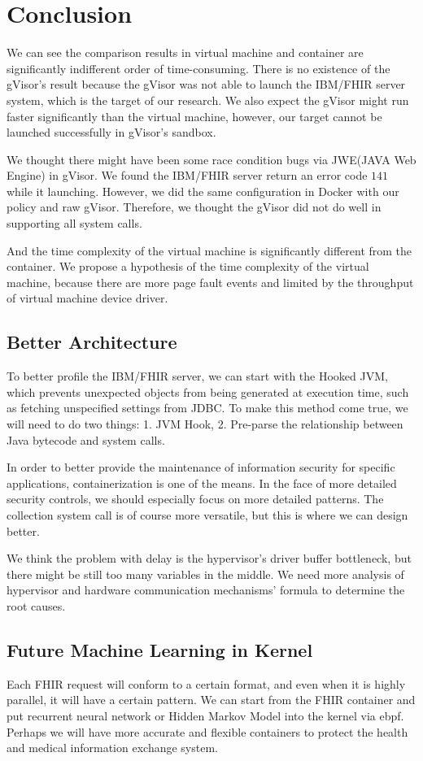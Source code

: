 \section{Conclusion}

We can see the comparison results in virtual machine and container are
significantly indifferent order of time-consuming. There is no existence
of the gVisor's result because the gVisor was not able to launch the
IBM/FHIR server system, which is the target of our research.
We also expect the gVisor might run faster significantly than the virtual
machine, however, our target cannot be launched successfully in
gVisor's sandbox.

We thought there might have been some race condition bugs via JWE(JAVA Web
Engine) in gVisor. We found the IBM/FHIR server return an error code $141$
while it launching. However, we did the same configuration in Docker with
our policy and raw gVisor. Therefore, we thought the gVisor did not do
well in supporting all system calls.

And the time complexity of the virtual machine is significantly different from
the container. We propose a hypothesis of the time complexity of the virtual
machine, because there are more page fault events and limited by the
throughput of virtual machine device driver\cite{10.5555/1267569.1267570,7095802}.

\subsection{Better Architecture}
To better profile the IBM/FHIR server, we can start with the Hooked JVM,
which prevents unexpected objects from being generated at execution time,
such as fetching unspecified settings from JDBC. To make this method come
true, we will need to do two things: 1. JVM Hook, 2. Pre-parse the relationship
between Java bytecode and system calls.

In order to better provide the maintenance of information security for specific
applications, containerization is one of the means. In the face of more detailed
security controls, we should especially focus on more detailed patterns. The
collection system call is of course more versatile, but this is where we can
design better.

We think the problem with delay is the hypervisor's driver buffer bottleneck, but
there might be still too many variables in the middle. We need more analysis of
hypervisor and hardware communication mechanisms' formula to determine the root
causes.

\subsection{Future Machine Learning in Kernel}
Each FHIR request will conform to a certain format, and even when it is highly
parallel, it will have a certain pattern. We can start from the FHIR container
and put recurrent neural network or Hidden Markov Model into the kernel via ebpf.
Perhaps we will have more accurate and flexible containers to protect the health
and medical information exchange system.
